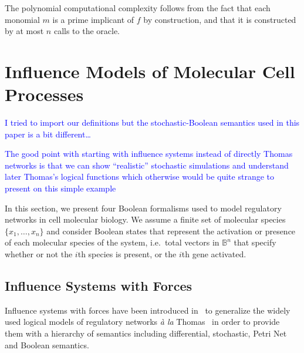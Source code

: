 \documentclass{llncs}
\newcommand{\francois}[1]{\textcolor{blue}{#1}}
\begin{document}
The polynomial computational complexity follows from the fact that each monomial $m$ is a prime implicant
of $f$ by construction, and that it is constructed by at most $n$ calls to the
oracle.




\section{Influence Models of Molecular Cell Processes}

\francois{I tried to import our definitions but the stochastic-Boolean semantics used in this paper is a bit different\dots}

\francois{The good point with starting with influence systems instead of directly Thomas networks
is that we can show ``realistic'' stochastic simulations and understand later Thomas's logical functions
which otherwise would be quite strange to present on this simple example}


In this section, we present four Boolean formalisms used to model regulatory networks in cell molecular biology.
We assume a finite set of molecular species $\{x_1,\dots,x_n\}$ 
and consider Boolean states that represent the activation or presence of each molecular species of the system, 
i.e.~total vectors in $\mathbb{B}^n$ that specify whether or not the $i$th species is present, or the $i$th gene activated.

\subsection{Influence Systems with Forces}


Influence systems with forces have been introduced in~\cite{FMRS16cmsb}
to generalize the widely used logical models of regulatory networks \emph{\`a la} Thomas~\cite{Thomas73jtb} 
in order to provide them with a hierarchy of semantics
including differential, stochastic, Petri Net and Boolean semantics.
\end{document}
